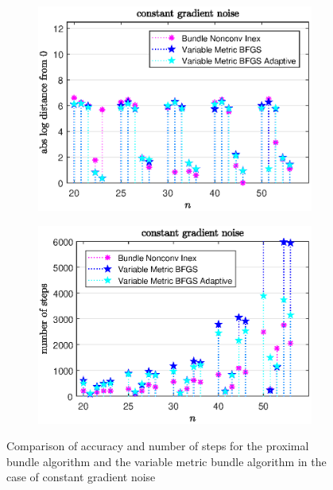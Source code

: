 \vspace{-1.5em}

\begin{figure}[H]
	\begin{subfigure}{0.49\textwidth}
		\includegraphics[width=\textwidth]{Pictures/Plots/constant_gradient_noise_b.eps}%
	\end{subfigure}
	\begin{subfigure}{0.49\textwidth}
		\includegraphics[width=\textwidth]{Pictures/Plots/steps_constant_gradient_noise_b.eps}%
	\end{subfigure}
	\caption{Comparison of accuracy and number of steps for the proximal bundle algorithm and the variable metric bundle algorithm in the case of constant gradient noise}%
	\label{fig_const_grad_noise_large}%
\end{figure}

